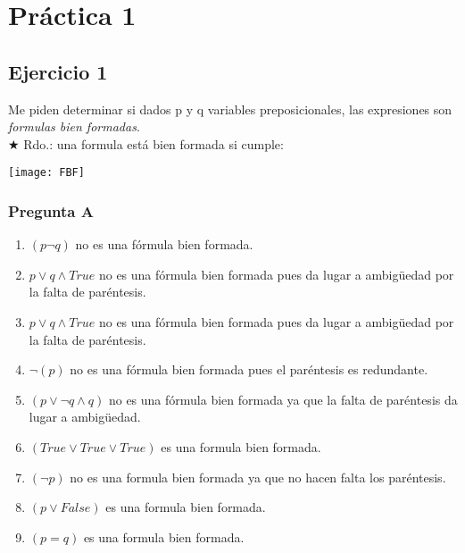 
\usepackage{graphicx}
\usepackage{amsfonts}
\graphicspath{ {images/} }




\maketitle
\newpage

\tableofcontents
\newpage

\section{Práctica 1}

\subsection{Ejercicio 1}

Me piden determinar si dados p y q variables preposicionales, las expresiones son \emph{formulas bien formadas}.\\
$\bigstar$ Rdo.: una formula está bien formada si cumple: 

\texttt{[image: FBF]}

\subsubsection{Pregunta A}
\begin{enumerate}
    \item $(p \neg q)$ no es una fórmula bien formada.
    \item $p \vee q \wedge True$ no es una fórmula bien formada pues da lugar a ambigüedad por la falta de paréntesis.
    \item $p \vee q \wedge True$ no es una fórmula bien formada pues da lugar a ambigüedad por la falta de paréntesis.
    \item $\neg (p)$ no es una fórmula bien formada pues el paréntesis es redundante.
    \item $(p \vee \neg q \wedge q)$ no es una fórmula bien formada ya que la falta de paréntesis da lugar a ambigüedad.
    \item $(True \vee True \vee True)$ es una formula bien formada.
    \item $(\neg p)$ no es una formula bien formada ya que no hacen falta los paréntesis.
    \item $(p \vee False)$ es una formula bien formada.
    \item $(p = q)$ es una formula bien formada.
\end{enumerate}


